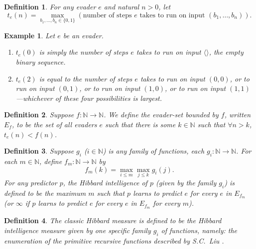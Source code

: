 \documentclass{article}
\newtheorem{definition}{Definition}
\newtheorem{example}[theorem]{Example}
\begin{document}
\begin{definition}
\label{tsubedefinition}
    For any evader $e$ and natural $n>0$,
    let
    \[
        t_e(n) = \max_{b_1,\ldots,b_n\in \{0,1\}}
        (\text{number of steps $e$ takes to run on input $(b_1,\ldots,b_n)$}).
    \]
\end{definition}

\begin{example}
Let $e$ be an evader.
\begin{enumerate}
    \item
    $t_e(0)$ is simply the number of steps $e$ takes to run on input $\langle\rangle$,
    the empty binary sequence.
    \item
    $t_e(2)$ is equal to the number of steps $e$ takes to run on input
    $(0,0)$, or to run on input $(0,1)$, or to run on input $(1,0)$, or to run on input
    $(1,1)$---whichever of these four possibilities is largest.
\end{enumerate}
\end{example}

\begin{definition}
\label{evadersetdefinition}
    Suppose $f:\mathbb N\to\mathbb N$. We define the \emph{evader-set bounded by $f$},
    written $E_f$, to be the set of all evaders $e$ such that
    there is some $k\in\mathbb N$ such that $\forall n>k$,
    $t_e(n)<f(n)$.
\end{definition}

\begin{definition}
\label{generalintelligencemeasuredefn}
    Suppose $g_i$ ($i\in \mathbb N$) is any family of functions,
    each $g_i:\mathbb N\to\mathbb N$.
    For each $m\in\mathbb N$, define $f_m:\mathbb N\to\mathbb N$ by
    \[f_m(k)=\max_{i\leq m}\max_{j\leq k}g_i(j).\]
    For any predictor $p$, the \emph{Hibbard intelligence of $p$ (given by the family $g_i$)}
    is defined to be the maximum $m$ such that
    $p$ learns to predict $e$ for every $e$ in $E_{f_m}$ (or $\infty$
    if $p$ learns to predict $e$ for every $e$ in $E_{f_m}$ for every $m$).
\end{definition}

\begin{definition}
\label{classichibbardmeasuredefn}
    The \emph{classic Hibbard measure} is defined to be the Hibbard intelligence
    measure given by one specific family $g_i$ of functions, namely:
    the enumeration of the primitive recursive functions described by S.C.\ Liu
    \cite{liu1960enumeration}.
\end{definition}
\end{document}
